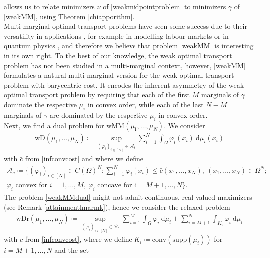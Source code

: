 \documentclass[10pt,a4paper]{amsart}
\newcommand{\dd}{\mathrm{d}}
\begin{document}
allows us to relate minimizers $\bar\nu$ of \eqref{weakmidpointproblem} to minimizers $\bar\gamma$ of \eqref{weakMM}, using Theorem \ref{chiapporithm}.\\
Multi-marginal optimal transport problems have seen some success due to their versatility in applications \cite{pass2015}, for example in modelling labour markets \cite{chiappori2010,carlier2010} or in quantum physics \cite{cotar2018}, and therefore we believe that problem \eqref{weakMM} is interesting in its own right.
To the best of our knowledge, the weak optimal transport problem has not been studied in a multi-marginal context, however, \eqref{weakMM} formulates a natural multi-marginal version for the weak optimal transport problem with barycentric cost. It encodes the inherent asymmetry of the weak optimal transport problem by requiring that each of the first $M$ marginals of $\gamma$ dominate the respective $\mu_i$ in convex order, while each of the last $N-M$ marginals of $\gamma$ are dominated by the respective $\mu_i$ in convex order.\\
Next, we find a dual problem for $\text{wMM}(\mu_1,\dots,\mu_N)$. We consider
\begin{gather}\label{weakMMdual}
	\text{wD}(\mu_1,\dots,\mu_N)\coloneqq\sup_{(\varphi_i)_{i\in[N]}\in\mathcal A_{\bar c}}\sum_{i=1}^N\int_{\Omega}\varphi_i(x_i)\ \dd\mu_i(x_i)
\end{gather}
with $\bar c$ from \eqref{infconvcost} and where we define
\begin{equation}\label{A_cset}
	\begin{gathered}
		\mathcal A_{\bar c}\coloneqq\Big\{(\varphi_i)_{i\in[N]}\in C(\Omega)^N: \sum_{i=1}^N\varphi_i(x_i)\leq \bar c(x_1,\dots,x_N),\ (x_1,\dots,x_N)\in\Omega^N;\\ \varphi_i\text{ convex for }i=1,\dots,M,\ \varphi_i\text{ concave for }i=M+1,\dots,N\Big\}.
	\end{gathered}
\end{equation}
The problem \eqref{weakMMdual} might not admit continuous, real-valued maximizers (see Remark \ref{attainmentlmarmk}), hence we consider the relaxed problem
\begin{gather}\label{weakMMdualrelaxed}
	\text{wDr}(\mu_1,\dots,\mu_N)\coloneqq\sup_{(\varphi_i)_{i\in[N]}\in\mathcal B_{\bar c}}\sum_{i=1}^M\int_{\Omega}\varphi_i\  \dd\mu_i+\sum_{i=M+1}^N\int_{K_i}\varphi_i\ \dd\mu_i
\end{gather}
with $\bar c$ from \eqref{infconvcost}, where we define $K_i\coloneqq\text{conv}(\text{supp}(\mu_i))$ for $i=M+1,\dots,N$ and the set
\end{document}
